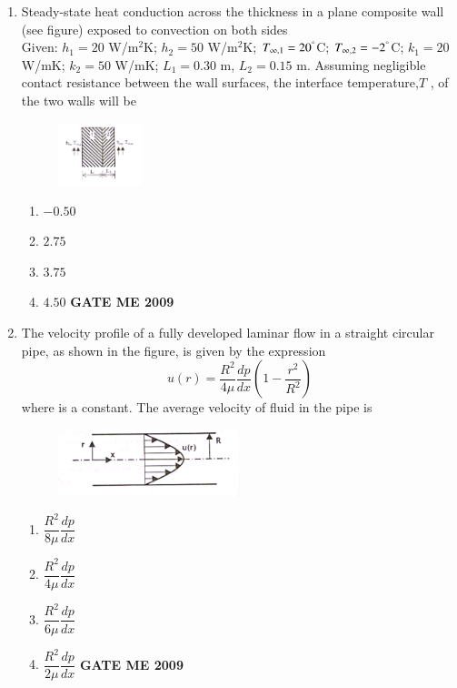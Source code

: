 \documentclass[journal]{IEEEtran}
\begin{document}
\begin{enumerate}[leftmargin=0pt]
\item Steady-state heat conduction across the thickness in a plane composite wall (see figure) exposed to convection on both sides\\Given: $h_1 = 20$ W/m$^2$K; $h_2 = 50$ W/m$^2$K; $T_{\infty,1}=20^\degree$C; $T_{\infty,2}=-2^\degree$C; $k_1 = 20$ W/mK; $k_2 = 50$ W/mK; $L_1 = 0.30$ m, $L_2 = 0.15$ m. Assuming negligible contact resistance between the wall surfaces, the interface temperature,$T$ , of the two walls will be 
\begin{figure}[h]
  \centering
  \includegraphics[width=0.23\textwidth]{Figs/image (5).png}
  \caption{}
\end{figure}


\begin{enumerate}[label=(\Alph*)]
  \item $-0.50$
  \item $2.75$
  \item $3.75$
  \item $4.50$
\hfill{\textbf{GATE ME 2009}}
\end{enumerate}



\item The velocity profile of a fully developed laminar flow in a straight circular pipe, as shown in the figure, is given by the expression
\[
u(r) = \frac{R^2}{4\mu} \frac{dp}{dx} \left(1 - \frac{r^2}{R^2}\right)
\]
where is a constant. The average velocity of fluid in the pipe is
\begin{figure}[h]
  \centering
  \includegraphics[width=0.5\textwidth]{Figs/image (6).png}
  \caption{}
\end{figure}


\begin{enumerate}[label=(\Alph*)]
  \item $\dfrac{R^2}{8\mu} \dfrac{dp}{dx}$
  \item $\dfrac{R^2}{4\mu} \dfrac{dp}{dx}$
  \item $\dfrac{R^2}{6\mu} \dfrac{dp}{dx}$
  \item $\dfrac{R^2}{2\mu} \dfrac{dp}{dx}$
\hfill{\textbf{GATE ME 2009}}
\end{enumerate}






\end{enumerate}
\end{document}
